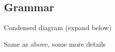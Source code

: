 \subsection{Grammar}\label{section: grammar}

Condensed diagram (expand below)

Same as above, some more details